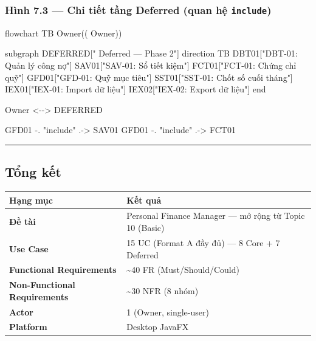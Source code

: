 \documentclass[11pt,a4paper]{article}
\newenvironment{Shaded}{}{}
\newcommand{\NormalTok}[1]{#1}
\newcounter{none}
\newcommand{\faintline}{%
  \noalign{\global\arrayrulecolor{faintgray}}%
  \hline
  \noalign{\global\arrayrulecolor{black}}%
} %
\begin{document}
\subsubsection{\texorpdfstring{Hình 7.3 --- Chi tiết tầng Deferred (quan hệ \texttt{include})}{Hình 7.3 --- Chi tiết tầng Deferred (quan hệ include)}}\label{huxecnh-7.3-chi-tiux1ebft-tux1ea7ng-deferred-quan-hux1ec7-include}

\begin{Shaded}
\begin{Highlighting}[]
\NormalTok{flowchart TB}
\NormalTok{    Owner(( Owner))}

\NormalTok{    subgraph DEFERRED[" Deferred — Phase 2"]}
\NormalTok{        direction TB}
\NormalTok{        DBT01["DBT{-}01: Quản lý công nợ"]}
\NormalTok{        SAV01["SAV{-}01: Sổ tiết kiệm"]}
\NormalTok{        FCT01["FCT{-}01: Chứng chỉ quỹ"]}
\NormalTok{        GFD01["GFD{-}01: Quỹ mục tiêu"]}
\NormalTok{        SST01["SST{-}01: Chốt số cuối tháng"]}
\NormalTok{        IEX01["IEX{-}01: Import dữ liệu"]}
\NormalTok{        IEX02["IEX{-}02: Export dữ liệu"]}
\NormalTok{    end}

\NormalTok{    Owner \textless{}{-}{-}\textgreater{} DEFERRED}

\NormalTok{    GFD01 {-}. "include" .{-}\textgreater{} SAV01}
\NormalTok{    GFD01 {-}. "include" .{-}\textgreater{} FCT01}
\end{Highlighting}
\end{Shaded}

\begin{center}\rule{1.0\linewidth}{0.5pt}\end{center}

\subsection{Tổng kết}\label{tux1ed5ng-kux1ebft}

{\def\LTcaptype{none}
\begin{longtable}[]{@{}ll@{}}
\toprule\noalign{}
Hạng mục & Kết quả \\
\midrule\noalign{}
\endhead
\bottomrule\noalign{}
\endlastfoot
\textbf{Đề tài} & Personal Finance Manager --- mở rộng từ Topic 10 (Basic) \\ \faintline
\textbf{Use Case} & 15 UC (Format A đầy đủ) --- 8 Core + 7 Deferred \\ \faintline
\textbf{Functional Requirements} & \textasciitilde40 FR (Must/Should/Could) \\ \faintline
\textbf{Non-Functional Requirements} & \textasciitilde30 NFR (8 nhóm) \\ \faintline
\textbf{Actor} & 1 (Owner, single-user) \\ \faintline
\textbf{Platform} & Desktop JavaFX \\
\end{longtable}
}
\end{document}
